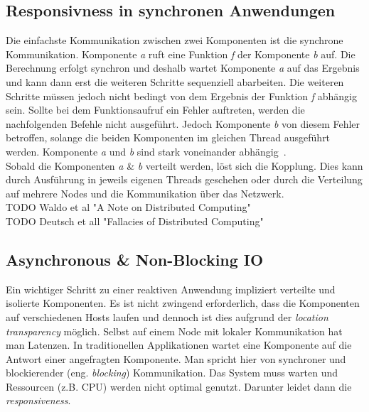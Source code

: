 \pagebreak

\subsection{Responsivness in synchronen Anwendungen}
Die einfachste Kommunikation zwischen zwei Komponenten ist die synchrone Kommunikation. Komponente \textit{a} ruft eine Funktion \textit{f} der Komponente \textit{b} auf. Die Berechnung erfolgt synchron und deshalb wartet Komponente \textit{a} auf das Ergebnis und kann dann erst die weiteren Schritte sequenziell abarbeiten. Die weiteren Schritte müssen jedoch nicht bedingt von dem Ergebnis der Funktion \textit{f} abhängig sein. Sollte bei dem Funktionsaufruf ein Fehler auftreten, werden die nachfolgenden Befehle nicht ausgeführt. Jedoch Komponente \textit{b} von diesem Fehler betroffen, solange die beiden Komponenten im gleichen Thread ausgeführt werden. Komponente \textit{a} und \textit{b} sind stark voneinander abhängig~\cite[S.~22]{kuhn_reactive_2015}.\\
Sobald die Komponenten \textit{a} \& \textit{b} verteilt werden, löst sich die Kopplung. Dies kann durch Ausführung in jeweils eigenen Threads geschehen oder durch die Verteilung auf mehrere Nodes und die Kommunikation über das Netzwerk.\\

TODO Waldo et al "A Note on Distributed Computing"\\
TODO Deutsch et all "Fallacies of Distributed Computing"

\subsection{Asynchronous \& Non-Blocking IO}
Ein wichtiger Schritt zu einer reaktiven Anwendung impliziert verteilte und isolierte Komponenten. Es ist nicht zwingend erforderlich, dass die Komponenten auf verschiedenen Hosts laufen und dennoch ist dies aufgrund der \textit{location transparency} möglich. Selbst auf einem Node mit lokaler Kommunikation hat man Latenzen. In traditionellen Applikationen wartet eine Komponente auf die Antwort einer angefragten Komponente. Man spricht hier von synchroner und blockierender (eng. \textit{blocking}) Kommunikation. Das System muss warten und Ressourcen (z.B. CPU) werden nicht optimal genutzt. Darunter leidet dann die \textit{responsiveness}.


